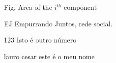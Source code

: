 \begin{siglas}
  \item[Fig.] Area of the $i^{th}$ component
  \item[EJ] Empurrando Juntos, rede social.
  \item[123] Isto é outro número
  \item[lauro cesar] este é o meu nome
\end{siglas}
